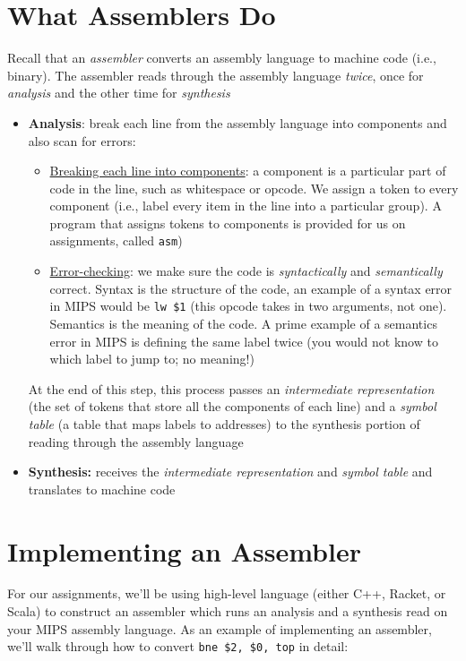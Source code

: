 \documentclass{report}
\begin{document}
\section{What Assemblers Do}
Recall that an \textit{assembler} converts an assembly language to machine code (i.e., binary). The assembler reads through the assembly language \textit{twice}, once for \textit{analysis} and the other time for \textit{synthesis}
\begin{itemize}
\item \textbf{Analysis}: break each line from the assembly language into components and also scan for errors:
\begin{itemize}
\item \underline{Breaking each line into components}: a component is a particular part of code in the line, such as whitespace or opcode. We assign a token to every component (i.e., label every item in the line into a particular group). A program that assigns tokens to components is provided for us on assignments, called \texttt{asm})
\item \underline{Error-checking}: we make sure the code is \textit{syntactically} and \textit{semantically} correct. Syntax is the structure of the code, an example of a syntax error in MIPS would be \texttt{lw \$1} (this opcode takes in two arguments, not one). Semantics is the meaning of the code. A prime example of a semantics error in MIPS is defining the same label twice (you would not know to which label to jump to; no meaning!)
\end{itemize}
At the end of this step, this process passes an \textit{intermediate representation} (the set of tokens that store all the components of each line) and a \textit{symbol table} (a table that maps labels to addresses) to the synthesis portion of reading through the assembly language
\item \textbf{Synthesis:} receives the \textit{intermediate representation} and \textit{symbol table} and translates to machine code
\end{itemize}
\section{Implementing an Assembler}
For our assignments, we'll be using high-level language (either C++, Racket, or Scala) to construct an assembler which runs an analysis and a synthesis read on your MIPS assembly language.
As an example of implementing an assembler, we'll walk through how to convert \texttt{bne \$2, \$0, top} in detail:
\end{document}
